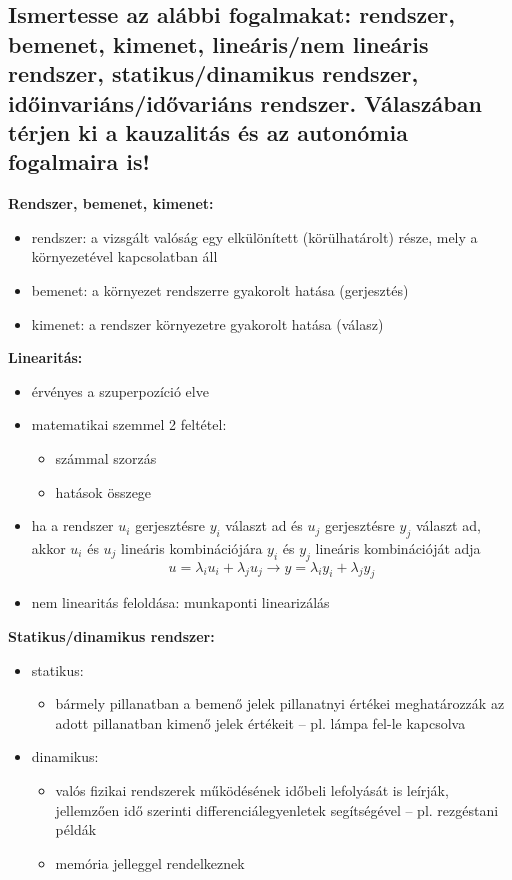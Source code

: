 \subsection{Ismertesse az alábbi fogalmakat: rendszer, bemenet, kimenet, lineáris/nem lineáris rendszer, statikus/dinamikus rendszer, időinvariáns/idővariáns rendszer. Válaszában térjen ki a kauzalitás és az autonómia fogalmaira is!}

\noindent \textbf{Rendszer, bemenet, kimenet:}
\begin{itemize}
    \item rendszer: a vizsgált valóság egy elkülönített (körülhatárolt) része, mely a környezetével kapcsolatban áll
    \item bemenet: a környezet rendszerre gyakorolt hatása (gerjesztés)
    \item kimenet: a rendszer környezetre gyakorolt hatása (válasz)
\end{itemize}

\noindent \textbf{Linearitás:}
\begin{itemize}
    \item érvényes a szuperpozíció elve
    \item matematikai szemmel 2 feltétel:
          \begin{itemize}
              \item számmal szorzás
              \item hatások összege
          \end{itemize}
    \item ha a rendszer $u_i$ gerjesztésre $y_i$ választ ad és $u_j$ gerjesztésre $y_j$ választ ad, akkor $u_i$ és $u_j$ lineáris kombinációjára $y_i$ és $y_j$ lineáris kombinációját adja
          $$u = \lambda_i u_i + \lambda_j u_j \rightarrow y = \lambda_i y_i + \lambda_j y_j$$
    \item nem linearitás feloldása: munkaponti linearizálás
\end{itemize}

\noindent \textbf{Statikus/dinamikus rendszer:}
\begin{itemize}
    \item statikus:
          \begin{itemize}
              \item bármely pillanatban a bemenő jelek pillanatnyi értékei meghatározzák az adott pillanatban kimenő jelek értékeit – pl. lámpa fel-le kapcsolva
          \end{itemize}
    \item dinamikus:
          \begin{itemize}
              \item valós fizikai rendszerek működésének időbeli lefolyását is leírják, jellemzően idő szerinti differenciálegyenletek segítségével – pl. rezgéstani példák
              \item memória jelleggel rendelkeznek
          \end{itemize}
\end{itemize}

